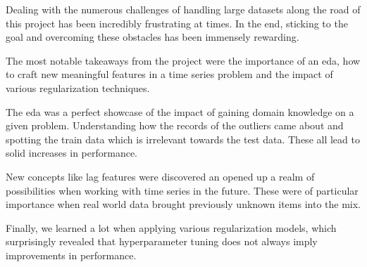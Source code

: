 Dealing with the numerous challenges of handling large datasets along the road of this project has been incredibly frustrating at times. In the end, sticking to the goal and overcoming these obstacles has been immensely rewarding.

The most notable takeaways from the project were the importance of an \acrshort{eda}, how to craft new meaningful features in a time series problem and the impact of various regularization techniques.

The \acrshort{eda} was a perfect showcase of the impact of gaining domain knowledge on a given problem. Understanding how the records of the outliers came about and spotting the train data which is irrelevant towards the test data. 
These all lead to solid increases in performance.

New concepts like lag features were discovered an opened up a realm of possibilities when working with time series in the future. These were of particular importance when real world data brought previously unknown items into the mix.

Finally, we learned a lot when applying various regularization models, which surprisingly revealed that \gls{hyperparameter} tuning does not always imply improvements in performance.
